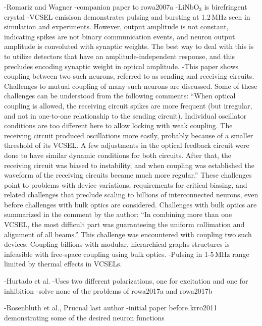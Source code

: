 \cite{rowa2007b}
-Romariz and Wagner
-companion paper to rowa2007a
-LiNbO$_3$ is birefringent crystal
-VCSEL emisison demonstrates pulsing and bursting at 1.2\,MHz seen in simulation and experiments. However, output amplitude is not constant, indicating spikes are not binary communication events, and neuron output amplitude is convoluted with synaptic weights. The best way to deal with this is to utilize detectors that have an amplitude-independent response, and this precludes encoding synaptic weight in optical amplitude.
-This paper shows coupling between two such neurons, referred to as sending and receiving circuits. Challenges to mutual coupling of many such neurons are discussed. Some of these challenges can be understood from the following comments: ``When optical coupling is allowed, the receiving circuit spikes are more frequent (but irregular, and not in one-to-one relationship to the sending circuit). Individual oscillator conditions are too different here to allow locking with weak coupling. The receiving circuit produced oscillations more easily, probably because of a smaller threshold of its VCSEL. A few adjustments in the optical feedback circuit were done to have similar dynamic conditions for both circuits. After that, the receiving circuit was biased to instability, and when coupling was established the waveform of the receiving circuits became much more regular.'' These challenges point to problems with device variations, requirements for critical biasing, and related challenges that preclude scaling to billions of interconnected neurons, even before challenges with bulk optics are considered. Challenges with bulk optics are summarized in the comment by the author: ``In combining more than one VCSEL, the most difficult part was guaranteeing the uniform collimation and alignment of all beams.'' This challenge was encountered with coupling two such devices. Coupling billions with modular, hierarchical graphs structures is infeasible with free-space coupling using bulk optics.
-Pulsing in 1-5\,MHz range limited by thermal effects in VCSELs.

\cite{huhe2010}
-Hurtado et al.
-Uses two different polarizations, one for excitation and one for inhibition
-solve none of the problems of rowa2017a and rowa2017b

\cite{rokr2009}
-Rosenbluth et al., Prucnal last author
-initial paper before krro2011 demonstrating some of the desired neuron functions

